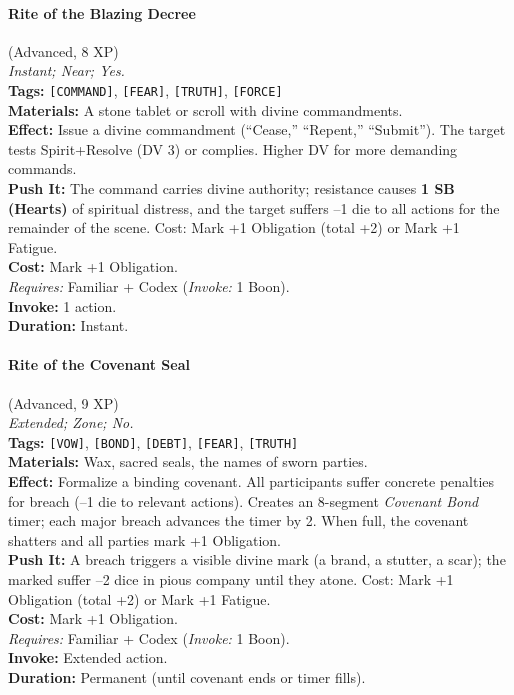 \paragraph{Rite of the Blazing Decree} (Advanced, 8 XP) \hfill \\
\emph{Instant; Near; Yes.} \\
\textbf{Tags:} \texttt{[COMMAND]}, \texttt{[FEAR]}, \texttt{[TRUTH]}, \texttt{[FORCE]} \\
\textbf{Materials:} A stone tablet or scroll with divine commandments. \\
\textbf{Effect:} Issue a divine commandment (``Cease,'' ``Repent,'' ``Submit''). The target tests Spirit+Resolve (DV 3) or complies. Higher DV for more demanding commands. \\
\textbf{Push It:} The command carries divine authority; resistance causes \textbf{1 SB (Hearts)} of spiritual distress, and the target suffers --1 die to all actions for the remainder of the scene. Cost: Mark +1 Obligation (total +2) or Mark +1 Fatigue. \\
\textbf{Cost:} Mark +1 Obligation. \\
\textit{Requires:} Familiar + Codex (\textit{Invoke:} 1 Boon). \\
\textbf{Invoke:} 1 action. \\
\textbf{Duration:} Instant.

\paragraph{Rite of the Covenant Seal} (Advanced, 9 XP) \hfill \\
\emph{Extended; Zone; No.} \\
\textbf{Tags:} \texttt{[VOW]}, \texttt{[BOND]}, \texttt{[DEBT]}, \texttt{[FEAR]}, \texttt{[TRUTH]} \\
\textbf{Materials:} Wax, sacred seals, the names of sworn parties. \\
\textbf{Effect:} Formalize a binding covenant. All participants suffer concrete penalties for breach (--1 die to relevant actions). Creates an 8-segment \textit{Covenant Bond} timer; each major breach advances the timer by 2. When full, the covenant shatters and all parties mark +1 Obligation. \\
\textbf{Push It:} A breach triggers a visible divine mark (a brand, a stutter, a scar); the marked suffer --2 dice in pious company until they atone. Cost: Mark +1 Obligation (total +2) or Mark +1 Fatigue. \\
\textbf{Cost:} Mark +1 Obligation. \\
\textit{Requires:} Familiar + Codex (\textit{Invoke:} 1 Boon). \\
\textbf{Invoke:} Extended action. \\
\textbf{Duration:} Permanent (until covenant ends or timer fills).

